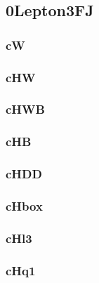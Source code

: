 \documentclass[landscape, 12pt,letterpaper]{article}
\begin{document}
\newpage

\newpage

\subsection{0Lepton3FJ }
\subsubsection{cW}


\newpage

\subsubsection{cHW}


\newpage

\subsubsection{cHWB}


\newpage

\subsubsection{cHB}


\newpage

\subsubsection{cHDD}


\newpage

\subsubsection{cHbox}


\newpage

\subsubsection{cHl3}


\newpage

\subsubsection{cHq1}

\end{document}
